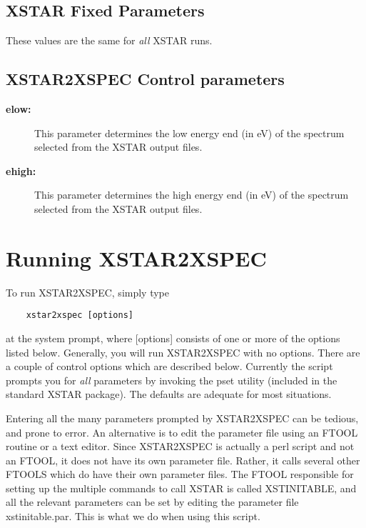 \subsection{XSTAR Fixed Parameters}

These values are the same for {\it all} XSTAR runs.

\subsection{XSTAR2XSPEC Control parameters}

\begin{description}
	\item[{\bf elow:}]  This parameter determines the low energy end (in 
	eV) of the spectrum selected from the XSTAR output files.

	\item[{\bf ehigh:}]   This parameter determines the high energy end (in 
	eV) of the spectrum selected from the XSTAR output files.
\end{description}

\section{Running XSTAR2XSPEC}

To run XSTAR2XSPEC, simply type

\begin{verbatim}
	xstar2xspec [options]
\end{verbatim}
at the system prompt, where [options] consists of one or more of the 
options listed below.  Generally, you will run XSTAR2XSPEC with no 
options.  There are a couple of control options which are 
described below.  Currently the script prompts you for {\it all} 
parameters by invoking the pset utility (included in the standard 
XSTAR package).  The defaults are adequate for most situations.

Entering all the many parameters prompted by XSTAR2XSPEC can be 
tedious, and prone to error.  An alternative is to edit the parameter 
file using an FTOOL routine or a text editor.  Since XSTAR2XSPEC is 
actually a perl script and not an FTOOL, it does not have its own 
parameter file.  Rather, it calls several other FTOOLS which do have 
their own parameter files.  The FTOOL responsible for setting up the 
multiple commands to call XSTAR is called XSTINITABLE, and all 
the relevant parameters can be set by editing the parameter file
xstinitable.par.  This is what we do when using this script.

